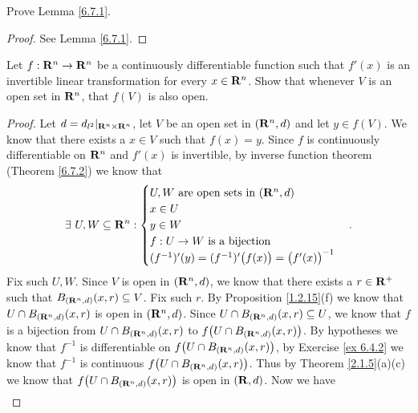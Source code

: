 \begin{exercise}\label{ex 6.7.2}
    Prove Lemma \ref{6.7.1}.
\end{exercise}

\begin{proof}
    See Lemma \ref{6.7.1}.
\end{proof}

\begin{exercise}\label{ex 6.7.3}
    Let \(f : \mathbf{R}^n \to \mathbf{R}^n\) be a continuously differentiable function such that \(f'(x)\) is an invertible linear transformation for every \(x \in \mathbf{R}^n\).
    Show that whenever \(V\) is an open set in \(\mathbf{R}^n\), that \(f(V)\) is also open.
\end{exercise}

\begin{proof}
    Let \(d = d_{l^2}|_{\mathbf{R}^n \times \mathbf{R}^n}\), let \(V\) be an open set in \((\mathbf{R}^n, d)\) and let \(y \in f(V)\).
    We know that there exists a \(x \in V\) such that \(f(x) = y\).
    Since \(f\) is continuously differentiable on \(\mathbf{R}^n\) and \(f'(x)\) is invertible, by inverse function theorem (Theorem \ref{6.7.2}) we know that
    \[
        \exists\ U, W \subseteq \mathbf{R}^n : \begin{cases}
            U, W \text{ are open sets in } (\mathbf{R}^n, d) \\
            x \in U                                  \\
            y \in W                                  \\
            f : U \to W \text{ is a bijection}       \\
            (f^{-1})'(y) = (f^{-1})'\big(f(x)\big) = \big(f'(x)\big)^{-1}
        \end{cases}.
    \]
    Fix such \(U, W\).
    Since \(V\) is open in \((\mathbf{R}^n, d)\), we know that there exists a \(r \in \mathbf{R}^+\) such that \(B_{(\mathbf{R}^n, d)}(x, r) \subseteq V\).
    Fix such \(r\).
    By Proposition \ref{1.2.15}(f) we know that \(U \cap B_{(\mathbf{R}^n, d)}(x, r)\) is open in \((\mathbf{R}^n, d)\).
    Since \(U \cap B_{(\mathbf{R}^n, d)}(x, r) \subseteq U\), we know that \(f\) is a bijection from \(U \cap B_{(\mathbf{R}^n, d)}(x, r)\) to \(f\big(U \cap B_{(\mathbf{R}^n, d)}(x, r)\big)\).
    By hypotheses we know that \(f^{-1}\) is differentiable on \(f\big(U \cap B_{(\mathbf{R}^n, d)}(x, r)\big)\), by Exercise \ref{ex 6.4.2} we know that \(f^{-1}\) is continuous \(f\big(U \cap B_{(\mathbf{R}^n, d)}(x, r)\big)\).
    Thus by Theorem \ref{2.1.5}(a)(c) we know that \(f\big(U \cap B_{(\mathbf{R}^n, d)}(x, r)\big)\) is open in \((\mathbf{R}, d)\).
    Now we have
    \begin{align*}

\end{align*}
\end{proof}
